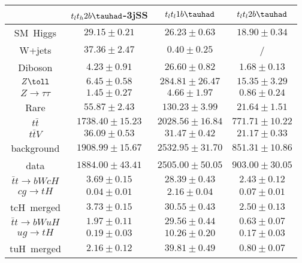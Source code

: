 \begin{tabular}{|c|c|c|c|} \hline
 & $t_{l}t_{h}2b\tauhad$-3jSS & $t_{l}t_{l}1b\tauhad$ & $t_{l}t_{l}2b\tauhad$\\\hline
SM~Higgs & $29.15\pm0.21$ & $26.23\pm0.63$ & $18.90\pm0.34$\\\hline
W+jets & $37.36\pm2.47$ & $0.40\pm0.25$ &  /\\\hline
Diboson & $4.23\pm0.91$ & $26.60\pm0.82$ & $1.68\pm0.13$\\\hline
$Z\toll$ & $6.45\pm0.58$ & $284.81\pm26.47$ & $15.35\pm3.29$\\\hline
$Z\to\tau\tau$ & $1.45\pm0.27$ & $4.66\pm1.97$ & $0.86\pm0.24$\\\hline
Rare & $55.87\pm2.43$ & $130.23\pm3.99$ & $21.64\pm1.51$\\\hline
$t\bar{t}$ & $1738.40\pm15.23$ & $2028.56\pm16.84$ & $771.71\pm10.22$\\\hline
$t\bar{t}V$ & $36.09\pm0.53$ & $31.47\pm0.42$ & $21.17\pm0.33$\\\hline
background & $1908.99\pm15.67$ & $2532.95\pm31.70$ & $851.31\pm10.86$\\\hline
data & $1884.00\pm43.41$ & $2505.00\pm50.05$ & $903.00\pm30.05$\\\hline
$\bar{t}t\to bWcH$ & $3.69\pm0.15$ & $28.39\pm0.43$ & $2.43\pm0.12$\\\hline
$cg\to tH$ & $0.04\pm0.01$ & $2.16\pm0.04$ & $0.07\pm0.01$\\\hline
tcH~merged & $3.73\pm0.15$ & $30.55\pm0.43$ & $2.50\pm0.13$\\\hline
$\bar{t}t\to bWuH$ & $1.97\pm0.11$ & $29.56\pm0.44$ & $0.63\pm0.07$\\\hline
$ug\to tH$ & $0.19\pm0.03$ & $10.26\pm0.20$ & $0.17\pm0.03$\\\hline
tuH~merged & $2.16\pm0.12$ & $39.81\pm0.49$ & $0.80\pm0.07$\\\hline
\end{tabular}
